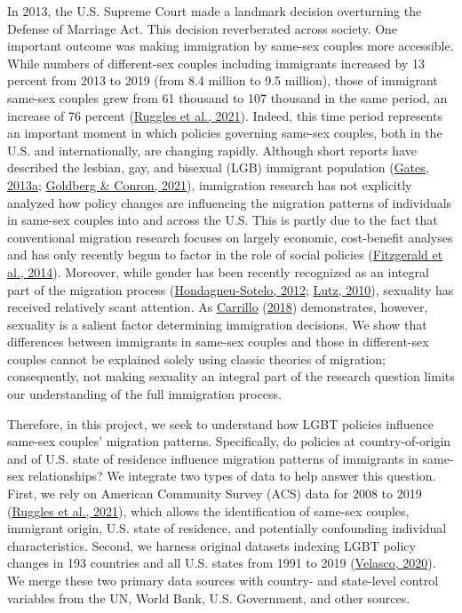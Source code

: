 \documentclass[
  11pt,
]{article}
\begin{document}
In 2013, the U.S. Supreme Court made a landmark decision overturning the Defense of Marriage Act. This decision reverberated across society. One important outcome was making immigration by same-sex couples more accessible. While numbers of different-sex couples including immigrants increased by 13 percent from 2013 to 2019 (from 8.4 million to 9.5 million), those of immigrant same-sex couples grew from 61 thousand to 107 thousand in the same period, an increase of 76 percent (\protect\hyperlink{ref-ruggles_2021}{Ruggles et al., 2021}). Indeed, this time period represents an important moment in which policies governing same-sex couples, both in the U.S. and internationally, are changing rapidly. Although short reports have described the lesbian, gay, and bisexual (LGB) immigrant population (\protect\hyperlink{ref-gates_2013}{Gates, 2013a}; \protect\hyperlink{ref-goldberg_2021}{Goldberg \& Conron, 2021}), immigration research has not explicitly analyzed how policy changes are influencing the migration patterns of individuals in same-sex couples into and across the U.S. This is partly due to the fact that conventional migration research focuses on largely economic, cost-benefit analyses and has only recently begun to factor in the role of social policies (\protect\hyperlink{ref-fitzgerald_2014}{Fitzgerald et al., 2014}). Moreover, while gender has been recently recognized as an integral part of the migration process (\protect\hyperlink{ref-hondagneu-sotelo_2012}{Hondagneu-Sotelo, 2012}; \protect\hyperlink{ref-lutz_2010}{Lutz, 2010}), sexuality has received relatively scant attention. As \protect\hyperlink{ref-carrillo_2018}{Carrillo} (\protect\hyperlink{ref-carrillo_2018}{2018}) demonstrates, however, sexuality is a salient factor determining immigration decisions. We show that differences between immigrants in same-sex couples and those in different-sex couples cannot be explained solely using classic theories of migration; consequently, not making sexuality an integral part of the research question limits our understanding of the full immigration process.

Therefore, in this project, we seek to understand how LGBT policies influence same-sex couples' migration patterns. Specifically, do policies at country-of-origin and of U.S. state of residence influence migration patterns of immigrants in same-sex relationships? We integrate two types of data to help answer this question. First, we rely on American Community Survey (ACS) data for 2008 to 2019 (\protect\hyperlink{ref-ruggles_2021}{Ruggles et al., 2021}), which allows the identification of same-sex couples, immigrant origin, U.S. state of residence, and potentially confounding individual characteristics. Second, we harness original datasets indexing LGBT policy changes in 193 countries and all U.S. states from 1991 to 2019 (\protect\hyperlink{ref-velasco_2020}{Velasco, 2020}). We merge these two primary data sources with country- and state-level control variables from the UN, World Bank, U.S. Government, and other sources.
\end{document}
